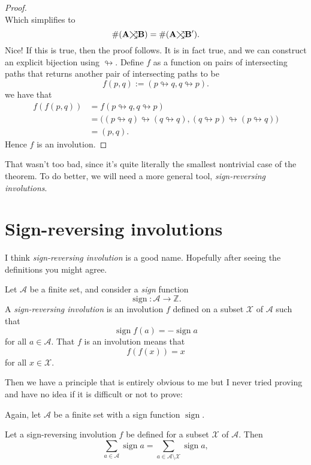 \documentclass{article}
\newcommand\toea{\mathrel{\ooalign{$\nearrow$\cr$\searrow$\cr}}}
\DeclareMathOperator{\sign}{sign}
\begin{document}
\begin{proof}
\[    \]
    Which simplifies to
    \[
        \#(\mathbf{A}{\toea}\mathbf{B}) = \#(\mathbf{A}{\toea}\mathbf{B}').
    \]
    Nice! If this is true, then the proof follows. It is in fact true, and we can construct an explicit bijection using $\looparrowright$.
    Define $f$ as a function on pairs of intersecting paths that returns another pair of intersecting paths to be
    \[
        f(p, q) := (p \looparrowright q, q \looparrowright p).
    \]
    we have that
    \begin{align*}
        f(f(p,q)) &= f(p\looparrowright q,q\looparrowright p) \\
                  &= \Big((p\looparrowright q)\looparrowright(q\looparrowright q),(q\looparrowright p)\looparrowright(p\looparrowright q)\Big) \\
                  &= (p, q).
    \end{align*}
    Hence $f$ is an involution. 
\end{proof}

That wasn't too bad, since it's quite literally the smallest nontrivial case of the theorem. To do better, we will need a more general tool, \textit{sign-reversing involutions}.

\section{Sign-reversing involutions}

I think \textit{sign-reversing involution} is a good name. Hopefully after seeing the definitions you might agree.

\begin{definition}
    Let $\mathcal{A}$ be a finite set, and consider a \textit{sign} function
    \[
        \sign: \mathcal{A} \to \mathbb{Z}.
    \]
    A \textit{sign-reversing involution} is an involution $f$ defined on a subset $\mathcal{X}$ of $\mathcal{A}$ such that 
    \[
        \sign f(a) = -\sign a
    \]
    for all $a \in \mathcal{A}$. That $f$ is an involution means that 
    \[
        f(f(x)) = x
    \]
    for all $x \in \mathcal{X}$.
\end{definition}

Then we have a principle that is entirely obvious to me but I never tried proving and have no idea if it is difficult or not to prove:

\begin{theorem}
    Again, let $\mathcal{A}$ be a finite set with a sign function $\sign$.

    Let a sign-reversing involution $f$ be defined for a subset $\mathcal{X}$ of $\mathcal{A}$. Then 
    \[
        \sum_{a\in\mathcal{A}} \sign a = \sum_{a\in\mathcal{A}\setminus\mathcal{X}} \sign a,
    \]
\end{theorem}
\end{document}
